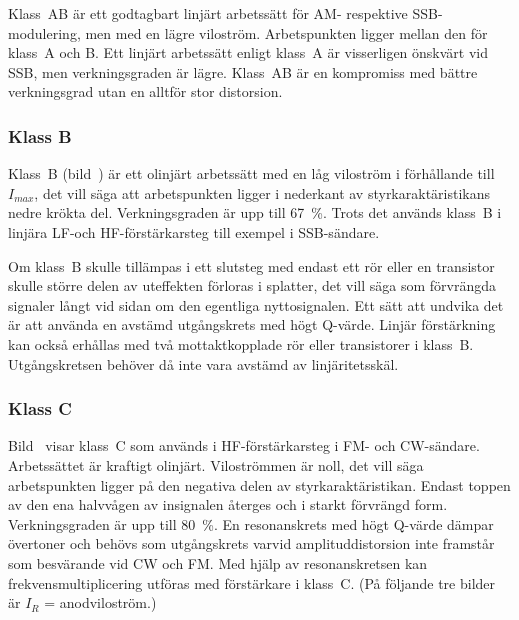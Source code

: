 Klass~AB är ett godtagbart linjärt arbetssätt för AM- respektive SSB-modulering,
men med en lägre viloström.
Arbetspunkten ligger mellan den för klass~A och B.
Ett linjärt arbetssätt enligt klass~A är visserligen önskvärt vid SSB, men
verkningsgraden är lägre.
Klass~AB är en kompromiss med bättre verkningsgrad utan en alltför stor
distorsion.


\subsubsection{Klass B}

Klass~B (bild~) är ett olinjärt arbetssätt med en låg
viloström i förhållande till \(I_{max}\), det vill säga att arbetspunkten ligger
i nederkant av styrkaraktäristikans nedre krökta del.
Verkningsgraden är upp till \qty{67}{\percent}.
Trots det används klass~B i linjära LF-och HF-förstärkarsteg till exempel i
SSB-sändare.

Om klass~B skulle tillämpas i ett slutsteg med endast ett rör eller en
transistor skulle större delen av uteffekten förloras i splatter,
det vill säga som förvrängda signaler långt vid sidan om den egentliga
nyttosignalen.
Ett sätt att undvika det är att använda en avstämd utgångskrets med högt
Q-värde.
Linjär förstärkning kan också erhållas med två mottaktkopplade rör eller
transistorer i klass~B.
Utgångskretsen behöver då inte vara avstämd av linjäritetsskäl.


\subsubsection{Klass C}

Bild~ visar klass~C som används i HF-förstärkar\-steg i
FM- och CW-sändare.
Arbetssättet är kraftigt olinjärt.
Viloströmmen är noll, det vill säga arbetspunkten ligger på den negativa delen
av styrkaraktäristikan.
Endast toppen av den ena halvvågen av insignalen återges och i starkt
förvrängd form.
Verkningsgraden är upp till \qty{80}{\percent}.
En resonanskrets med högt Q-värde dämpar övertoner och behövs som utgångskrets
varvid amplituddistorsion inte framstår som besvärande vid CW och FM.
Med hjälp av resonanskretsen kan frekvensmultiplicering utföras med
förstärkare i klass~C.
(På följande tre bilder är \(I_R\) = anodviloström.)

